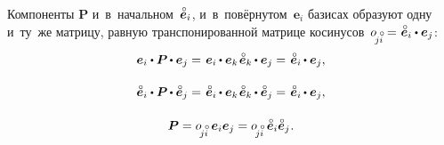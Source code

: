 \begin{otherlanguage}{russian}
Компоненты ${\bm{P}}$ и~в~начальном~${\mathcircabove{\bm{e}}_i}$, и~в~повёрнутом~${\bm{e}_i}$ базисах образуют одну и~ту~же матрицу, равную транспонированной матрице косинусов~${\cosinematrix{\!j\mathcircabove{i}} = \hspace{.12ex} \mathcircabove{\bm{e}}_i \dotp \bm{e}_j}$\hspace{.1ex}:
\begin{equation}\label{componentsofrotationtensor}
\begin{array}{c}
\bm{e}_i \dotp \bm{P} \hspace{-0.12ex} \dotp \bm{e}_j =
\hspace{.2ex} \tikzmark{beginEqualsKroneckerDeltaPresent} \bm{e}_i \hspace{-0.1ex} \dotp \bm{e}_k \tikzmark{endEqualsKroneckerDeltaPresent} \hspace{.2ex} \mathcircabove{\bm{e}}_k \hspace{-0.12ex} \dotp \bm{e}_j =
\hspace{.2ex} \mathcircabove{\bm{e}}_i \hspace{-0.12ex} \dotp \bm{e}_j , \\[1.4em]
%
\mathcircabove{\bm{e}}_i \dotp \bm{P} \hspace{-0.12ex} \dotp \mathcircabove{\bm{e}}_j =
\hspace{.2ex} \mathcircabove{\bm{e}}_i \hspace{-0.1ex} \dotp \bm{e}_k \hspace{.2ex} \tikzmark{beginEqualsKroneckerDeltaPast} \mathcircabove{\bm{e}}_k \hspace{-0.12ex} \dotp \mathcircabove{\bm{e}}_j \tikzmark{endEqualsKroneckerDeltaPast} =
\hspace{.2ex} \mathcircabove{\bm{e}}_i \hspace{-0.12ex} \dotp \bm{e}_j , \\[1.5em]
%
\bm{P} = \cosinematrix{\!j\mathcircabove{i}} \hspace{.5ex} {\bm{e}}_i {\bm{e}}_j = \cosinematrix{\!j\mathcircabove{i}} \hspace{.5ex} \mathcircabove{\bm{e}}_i \mathcircabove{\bm{e}}_j
\hspace{.1ex} .
\end{array}
\end{equation}


\end{otherlanguage}
